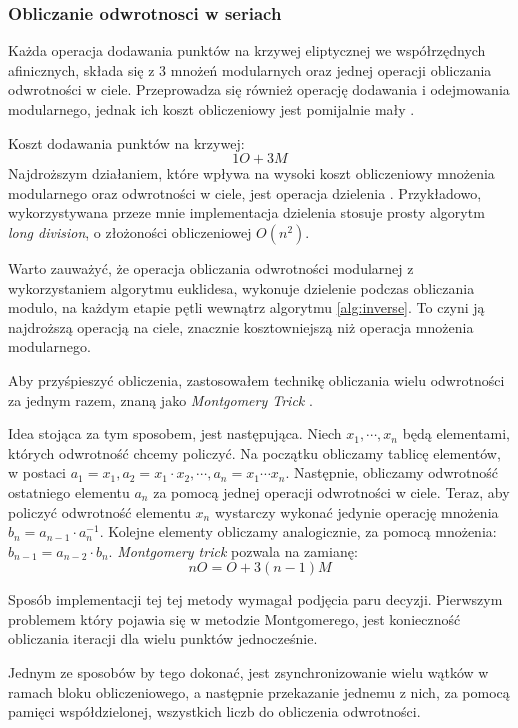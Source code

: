 \subsubsection{Obliczanie odwrotnosci w seriach}
Każda operacja dodawania punktów na krzywej eliptycznej we współrzędnych afinicznych, składa się z 3 mnożeń modularnych oraz jednej operacji obliczania odwrotności w ciele.
Przeprowadza się również operację dodawania i odejmowania modularnego, jednak ich koszt obliczeniowy jest pomijalnie mały \cite{Blake2005}.
\par
Koszt dodawania punktów na krzywej:
$$
    1O + 3M
$$
Najdroższym działaniem, które wpływa na wysoki koszt obliczeniowy  mnożenia modularnego oraz odwrotności w ciele,
jest operacja dzielenia \cite{Menezes2001}.
Przykładowo, wykorzystywana przeze mnie implementacja dzielenia stosuje prosty algorytm \textit{long division},
o złożoności obliczeniowej $O(n^2)$.
\par
Warto zauważyć, że operacja obliczania odwrotności modularnej z wykorzystaniem algorytmu euklidesa, wykonuje dzielenie
podczas obliczania modulo, na każdym etapie pętli wewnątrz algorytmu \ref{alg:inverse}.
To czyni ją najdroższą operacją na ciele, znacznie kosztowniejszą niż operacja mnożenia modularnego.
\par
Aby przyśpieszyć obliczenia, zastosowałem technikę obliczania wielu odwrotności za jednym razem,
znaną jako \textit{Montgomery Trick} \cite{Montgomery1987}.
\par
Idea stojąca za tym sposobem, jest następująca.
Niech $x_1, \cdots ,x_n$ będą elementami, których odwrotność chcemy policzyć.
Na początku obliczamy tablicę elementów, w postaci $a_1 = x_1, a_2 = x_1\cdot x_2 , \cdots, a_n = x_1 \cdots x_n$.
Następnie, obliczamy odwrotność ostatniego elementu $a_n$ za pomocą jednej operacji odwrotności w ciele.
Teraz, aby policzyć odwrotność elementu $x_n$ wystarczy wykonać jedynie operację mnożenia
$b_n = a_{n-1} \cdot a_{n}^{-1}$. Kolejne elementy obliczamy analogicznie, za pomocą mnożenia:
$b_{n-1} = a_{n-2} \cdot b_{n}$.
\textit{Montgomery trick} pozwala na zamianę:
$$
    nO = O + 3(n - 1)M
$$
\par
Sposób implementacji tej tej metody wymagał podjęcia paru decyzji.
Pierwszym problemem który pojawia się w metodzie Montgomerego,
jest konieczność
obliczania iteracji dla wielu punktów jednocześnie.
\par
Jednym ze sposobów by tego dokonać,
jest zsynchronizowanie wielu wątków w ramach bloku obliczeniowego, a następnie przekazanie
jednemu z nich, za pomocą pamięci współdzielonej, wszystkich liczb do obliczenia odwrotności.
